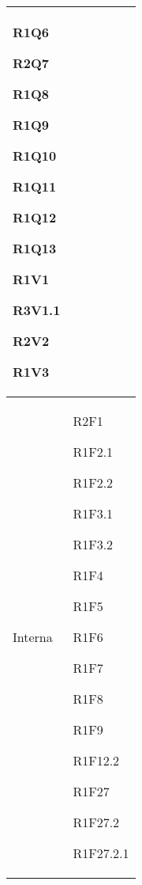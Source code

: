 \begin{center}
\begin{longtable}{|p{44mm}|p{22mm}|}
R1Q6 \newline

R2Q7 \newline

R1Q8 \newline

R1Q9 \newline

R1Q10 \newline

R1Q11 \newline

R1Q12 \newline

R1Q13 \newline

 R1V1 \newline

R3V1.1 \newline

R2V2 \newline

R1V3 \newline
\\
\hline
Interna &

 R2F1 \newline

R1F2.1 \newline

R1F2.2 \newline

R1F3.1 \newline

R1F3.2 \newline

R1F4 \newline

R1F5 \newline

R1F6 \newline

R1F7 \newline

R1F8 \newline

R1F9 \newline

R1F12.2 \newline

R1F27 \newline

R1F27.2 \newline

R1F27.2.1 \newline


\end{longtable}
\end{center}

